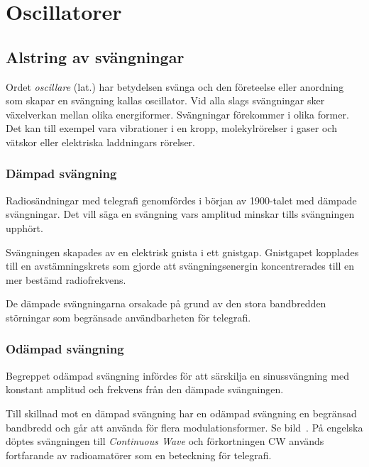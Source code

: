 \section{Oscillatorer}
\label{oscillatorer}

\subsection{Alstring av svängningar}
\label{svängningar_alstring}
Ordet \emph{oscillare} (lat.) har betydelsen svänga och den företeelse
eller anordning som skapar en svängning kallas oscillator.
Vid alla slags svängningar sker växelverkan mellan olika energiformer.
Svängningar förekommer i olika former.
Det kan till exempel vara vibrationer i en kropp, molekylrörelser i gaser och
vätskor eller elektriska laddningars rörelser.


\subsubsection{Dämpad svängning}
Radiosändningar med telegrafi genomfördes i början av 1900-talet med dämpade
svängningar.
Det vill säga en svängning vars amplitud minskar tills svängningen upphört.

Svängningen skapades av en elektrisk gnista i ett gnistgap.
Gnistgapet kopplades till en avstämningskrets som gjorde att svängningsenergin
koncentrerades till en mer bestämd radiofrekvens.

De dämpade svängningarna orsakade på grund av den stora bandbredden störningar
som begränsade användbarheten för telegrafi.

\subsubsection{Odämpad svängning}
Begreppet odämpad svängning infördes för att särskilja en sinussvängning med 
konstant amplitud och frekvens från den dämpade svängningen.

Till skillnad mot en dämpad svängning har en odämpad svängning en begränsad
bandbredd och går att använda för flera modulationsformer. Se bild~.
På engelska döptes svängningen till \emph{Continuous Wave} och förkortningen CW
används fortfarande av radioamatörer som en beteckning för telegrafi.

